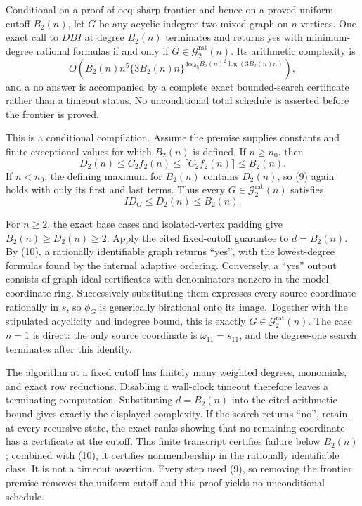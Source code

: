 Conditional on a proof of \(\mathrm{oeq:sharp\mbox{-}frontier}\) and hence on a proved uniform cutoff \(B_2(n)\), let \(G\) be any acyclic indegree-two mixed graph on \(n\) vertices. One exact call to \(DBI\) at degree \(B_2(n)\) terminates and returns yes with minimum-degree rational formulas if and only if \(G\in\mathcal G_{2}^{\mathrm{rat}}(n)\). Its arithmetic complexity is
\[
O\!\left(B_2(n)n^5\{3B_2(n)n\}^{4\alpha_{\mathrm{alg}}B_2(n)^2\log(3B_2(n)n)}\right),
\]
and a no answer is accompanied by a complete exact bounded-search certificate rather than a timeout status. No unconditional total schedule is asserted before the frontier is proved.

This is a conditional compilation.  Assume the premise supplies constants and finite exceptional values for which \(B_2(n)\) is defined.  If \(n\geq n_0\), then
\[
 D_2(n)\leq C_2f_2(n)\leq\lceil C_2f_2(n)\rceil\leq B_2(n). \tag{9}
\]
If \(n<n_0\), the defining maximum for \(B_2(n)\) contains \(D_2(n)\), so (9) again holds with only its first and last terms.  Thus every \(G\in\mathcal G_2^{\mathrm{rat}}(n)\) satisfies
\[
 ID_G\leq D_2(n)\leq B_2(n). \tag{10}
\]

For \(n\geq2\), the exact base cases and isolated-vertex padding give \(B_2(n)\geq D_2(n)\geq2\).  Apply the cited fixed-cutoff guarantee to \(d=B_2(n)\).  By (10), a rationally identifiable graph returns ``yes'', with the lowest-degree formulas found by the internal adaptive ordering.  Conversely, a ``yes'' output consists of graph-ideal certificates with denominators nonzero in the model coordinate ring.  Successively substituting them expresses every source coordinate rationally in \(s\), so \(\phi_G\) is generically birational onto its image.  Together with the stipulated acyclicity and indegree bound, this is exactly \(G\in\mathcal G_2^{\mathrm{rat}}(n)\).  The case \(n=1\) is direct: the only source coordinate is \(\omega_{11}=s_{11}\), and the degree-one search terminates after this identity.

The algorithm at a fixed cutoff has finitely many weighted degrees, monomials, and exact row reductions.  Disabling a wall-clock timeout therefore leaves a terminating computation.  Substituting \(d=B_2(n)\) into the cited arithmetic bound gives exactly the displayed complexity.  If the search returns ``no'', retain, at every recursive state, the exact ranks showing that no remaining coordinate has a certificate at the cutoff.  This finite transcript certifies failure below \(B_2(n)\); combined with (10), it certifies nonmembership in the rationally identifiable class.  It is not a timeout assertion.  Every step used (9), so removing the frontier premise removes the uniform cutoff and this proof yields no unconditional schedule.

